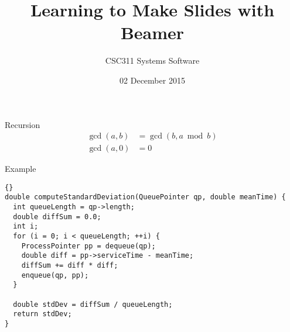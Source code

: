 \documentclass{beamer}
\title{Learning to Make Slides with Beamer}
\author{CSC311 Systems Software}
\institute{Cornell College}
\date{02 December 2015}
\begin{document}
\begin{frame}
  \titlepage
\end{frame}

\begin{frame}{Recursion}
\begin{align*}
  \gcd (a, b) & = \gcd( b, a \bmod b ) \\
  \gcd( a, 0 ) & = 0
  \end{align*}
\end{frame}

\begin{frame}[fragile]{Example}

  \begin{lstlisting}{}
double computeStandardDeviation(QueuePointer qp, double meanTime) {
  int queueLength = qp->length;
  double diffSum = 0.0;
  int i;
  for (i = 0; i < queueLength; ++i) {
    ProcessPointer pp = dequeue(qp);
    double diff = pp->serviceTime - meanTime;
    diffSum += diff * diff;
    enqueue(qp, pp);
  }

  double stdDev = diffSum / queueLength;
  return stdDev;
}
    \end{lstlisting}

\end{frame}
\end{document}
